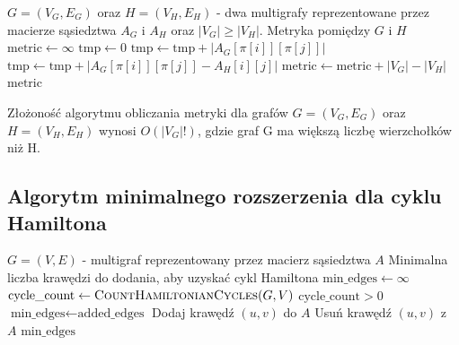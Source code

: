 \begin{algorithm}[H]
\caption{Obliczanie metryki pomiędzy dwoma multigrafami}
\begin{algorithmic}[1]
\Require \( G = (V_G, E_G) \) oraz \( H = (V_H, E_H) \) - dwa multigrafy reprezentowane przez macierze sąsiedztwa \( A_G \) i \( A_H \) oraz $\left| V_G \right| \geq \left| V_H \right|$.
\Ensure Metryka pomiędzy \( G \) i \( H \)
\State \( \text{metric} \gets \infty \)
    \State \( \text{tmp} \gets 0 \)
            \State \( \text{tmp} \gets \text{tmp} + \left| A_G[\pi[i]][\pi[j]] \right| \)
        \ElsIf{}
            \State \( \text{tmp} \gets \text{tmp} + \left| A_G[\pi[i]][\pi[j]] - A_H[i][j] \right| \)
        \EndIf
    \EndFor
\EndFor
\State $\text{metric} \gets \text{metric} + \left| V_G \right| - \left| V_H \right|$
\State \Return \( \text{metric} \)
\end{algorithmic}
\end{algorithm}

Złożoność algorytmu obliczania metryki dla grafów \(G = (V_G, E_G) \) oraz \( H = (V_H, E_H) \) wynosi \( O(\left| V_G \right| !) \), gdzie graf G ma większą liczbę wierzchołków niż H.


\subsection{Algorytm minimalnego rozszerzenia dla cyklu Hamiltona}

\begin{algorithm}[H]
\caption{Minimalne rozszerzenie dla cyklu Hamiltona}
\label{alg:minimal_extension}
\begin{algorithmic}[1]
\Require \( G = (V, E) \) - multigraf reprezentowany przez macierz sąsiedztwa \( A \)
\Ensure Minimalna liczba krawędzi do dodania, aby uzyskać cykl Hamiltona
\State \( \text{min\_edges} \gets \infty \)
    \State \( \text{cycle\_count} \gets \textsc{CountHamiltonianCycles}(G, V) \)
    \State \Return \( \text{cycle\_count} > 0 \)
\EndFunction
{}
        \State \Return
    \EndIf
        \State \( \text{min\_edges} \gets \text{added\_edges} \)
        \State \Return
    \EndIf
            \State Dodaj krawędź \( (u, v) \) do \( A \)
            \State {}
            \State Usuń krawędź \( (u, v) \) z \( A \)
        \EndIf
    \EndFor
\EndFunction
\State {}
\State \Return \( \text{min\_edges} \)
\end{algorithmic}
\end{algorithm}

